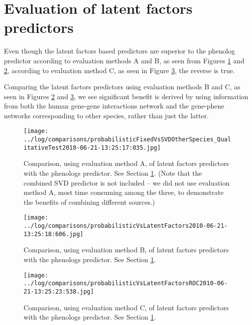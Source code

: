 \documentclass{article}
\begin{document}
\section{Evaluation of latent factors predictors}
\label{sec:Evaluation of latent factors predictors}
Even though the latent factors based predictors are superior to the phenolog predictor according to evaluation methods A and B, as seen from Figures \ref{fig:probabilisticFixedVsSVDOtherSpecies_QualitativeTest2010} and \ref{fig:probabilisticVsLatentFactors2010}, according to evaluation method C, as seen in Figure \ref{fig:probabilisticVsLatentFactorsROC2010}, the reverse is true.

Comparing the latent factors predictors using evaluation methods B and C, as seen in Figures \ref{fig:probabilisticVsLatentFactors2010} and \ref{fig:probabilisticVsLatentFactorsROC2010}, we see significant benefit is derived by using information from both the human gene-gene interactions network and the gene-phene networks corresponding to other species, rather than just the latter.

\begin{figure}[h]
\texttt{[image: ../log/comparisons/probabilisticFixedVsSVDOtherSpecies\_QualitativeTest2010-06-21-13:25:17:035.jpg]}
\caption{Comparison, using evaluation method A, of latent factors predictors with the phenologs predictor. See Section \ref{sec:Evaluation of latent factors predictors}. (Note that the combined SVD predictor is not included -- we did not use evaluation method A, most time consuming among the three, to demonstrate the benefits of combining different sources.)}
\label{fig:probabilisticFixedVsSVDOtherSpecies_QualitativeTest2010}
\end{figure}

\begin{figure}[h]
\texttt{[image: ../log/comparisons/probabilisticVsLatentFactors2010-06-21-13:25:18:606.jpg]}
\caption{Comparison, using evaluation method B, of latent factors predictors with the phenologs predictor. See Section \ref{sec:Evaluation of latent factors predictors}.}
\label{fig:probabilisticVsLatentFactors2010}
\end{figure}

\begin{figure}[h]
\texttt{[image: ../log/comparisons/probabilisticVsLatentFactorsROC2010-06-21-13:25:23:538.jpg]}
\caption{Comparison, using evaluation method C, of latent factors predictors with the phenologs predictor. See Section \ref{sec:Evaluation of latent factors predictors}.}
\label{fig:probabilisticVsLatentFactorsROC2010}
\end{figure}
\end{document}
